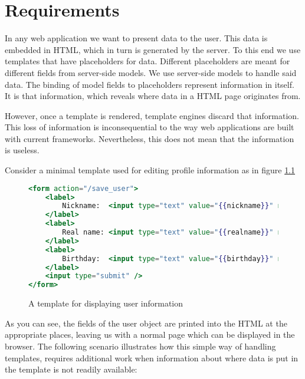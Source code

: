 \documentclass[thesis.tex]{subfiles}
\begin{document}
\chapter{Requirements}
\label{chap:requirements}
In any web application we want to present data to the user.
This data is embedded in HTML, which in turn is generated by the server.
To this end we use templates that have placeholders for data.
Different placeholders are meant for different fields from server-side models.
We use server-side models to handle said data.
The binding of model fields to placeholders represent information in
itself. It is that information, which reveals where data in a HTML page
originates from.

However, once a template is rendered, template engines discard that information.
This loss of information is inconsequential to the way web applications are
built with current frameworks.
Nevertheless, this does not mean that the information is useless.

Consider a minimal template used for editing profile information as in
figure \ref{fig:user.mustache}
\begin{figure}
	\centering
	\begin{lstlisting}[language=mustache]
<form action="/save_user">
	<label>
		Nickname:  <input type="text" value="{{nickname}}" name="nickname" />
	</label>
	<label>
		Real name: <input type="text" value="{{realname}}" name="realname" />
	</label>
	<label>
		Birthday:  <input type="text" value="{{birthday}}" name="birthday" />
	</label>
	<input type="submit" />
</form>
	\end{lstlisting}
	\caption{A template for displaying user information}
	\label{fig:user.mustache}
\end{figure}
As you can see, the fields of the user object are printed into the HTML
at the appropriate places, leaving us with a normal page which can be
displayed in the browser.
The following scenario illustrates how this simple way of handling templates,
requires additional work when information about where data is put in the
template is not readily available:
\end{document}
